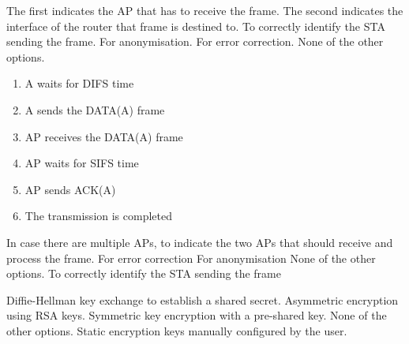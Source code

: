 \begin{questions}
    \begin{checkboxes}
        \CorrectChoice The first indicates the AP that has to receive the frame. The second indicates the interface of the router that frame is destined to.
        \choice To correctly identify the STA sending the frame.
        \choice For anonymisation.
        \choice For error correction.
        \choice None of the other options.
    \end{checkboxes}

    \begin{solution}
        \begin{enumerate}
            \item A waits for DIFS time
            \item A sends the DATA(A) frame
            \item AP receives the DATA(A) frame
            \item AP waits for SIFS time
            \item AP sends ACK(A)
            \item The transmission is completed
        \end{enumerate}
    \end{solution}

    \begin{checkboxes}
        \choice In case there are multiple APs, to indicate the two APs that should receive and process the frame.
        \choice For error correction
        \choice For anonymisation
        \CorrectChoice None of the other options.
        \choice To correctly identify the STA sending the frame
    \end{checkboxes}

    \begin{checkboxes}
        \CorrectChoice Diffie-Hellman key exchange to establish a shared secret.
        \choice Asymmetric encryption using RSA keys.
        \choice Symmetric key encryption with a pre-shared key.
        \choice None of the other options.
        \choice Static encryption keys manually configured by the user.
    \end{checkboxes}


\end{questions}
